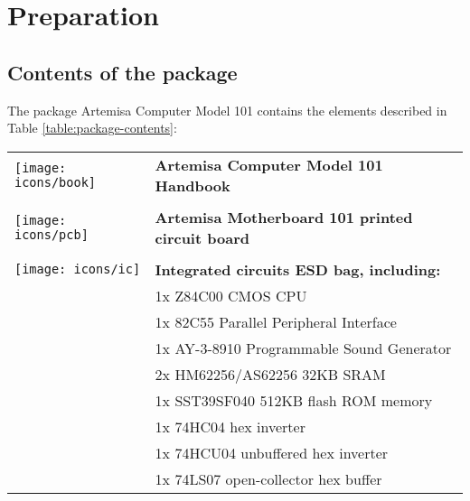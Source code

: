 \chapter{Preparation}

\section{Contents of the package}

The package Artemisa Computer Model 101 contains the elements described in Table \ref{table:package-contents}:\\

\begin{longtable}{m{10mm}|l}
	\centering
	\texttt{[image: icons/book]}          & {\bf Artemisa Computer Model 101 Handbook}                  \\
	                                      &                                                             \\
	\texttt{[image: icons/pcb]}           & {\bf Artemisa Motherboard 101 printed circuit board}        \\
	                                      &                                                             \\
	\texttt{[image: icons/ic]}            & {\bf Integrated circuits ESD bag, including:}               \\
	                                      & 1x Z84C00 CMOS CPU                                          \\
	                                      & 1x 82C55 Parallel Peripheral Interface                      \\			
	                                      & 1x AY-3-8910 Programmable Sound Generator                   \\
	                                      & 2x HM62256/AS62256 32KB SRAM                                \\
	                                      & 1x SST39SF040 512KB flash ROM memory                        \\
	                                      & 1x 74HC04 hex inverter                                      \\
	                                      & 1x 74HCU04 unbuffered hex inverter                          \\
	                                      & 1x 74LS07 open-collector hex buffer                         \\

\end{longtable}
